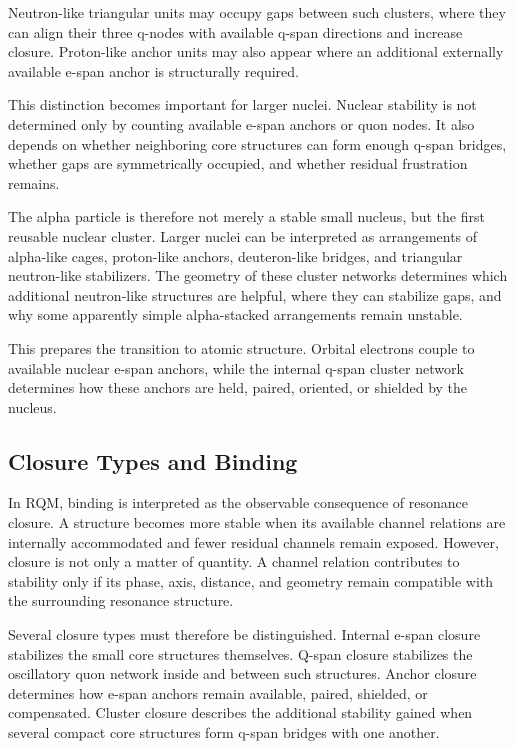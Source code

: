 \documentclass[11pt,a4paper]{article}
\begin{document}
Neutron-like triangular units may occupy gaps between such clusters, where they can align their three q-nodes with available q-span directions and increase closure. Proton-like anchor units may also appear where an additional externally available e-span anchor is structurally required.

This distinction becomes important for larger nuclei. Nuclear stability is not determined only by counting available e-span anchors or quon nodes. It also depends on whether neighboring core structures can form enough q-span bridges, whether gaps are symmetrically occupied, and whether residual frustration remains.

The alpha particle is therefore not merely a stable small nucleus, but the first reusable nuclear cluster. Larger nuclei can be interpreted as arrangements of alpha-like cages, proton-like anchors, deuteron-like bridges, and triangular neutron-like stabilizers. The geometry of these cluster networks determines which additional neutron-like structures are helpful, where they can stabilize gaps, and why some apparently simple alpha-stacked arrangements remain unstable.

This prepares the transition to atomic structure. Orbital electrons couple to available nuclear e-span anchors, while the internal q-span cluster network determines how these anchors are held, paired, oriented, or shielded by the nucleus.



\subsection{Closure Types and Binding}

In RQM, binding is interpreted as the observable consequence of resonance closure. A structure becomes more stable when its available channel relations are internally accommodated and fewer residual channels remain exposed. However, closure is not only a matter of quantity. A channel relation contributes to stability only if its phase, axis, distance, and geometry remain compatible with the surrounding resonance structure.

Several closure types must therefore be distinguished. Internal e-span closure stabilizes the small core structures themselves. Q-span closure stabilizes the oscillatory quon network inside and between such structures. Anchor closure determines how e-span anchors remain available, paired, shielded, or compensated. Cluster closure describes the additional stability gained when several compact core structures form q-span bridges with one another.
\end{document}
